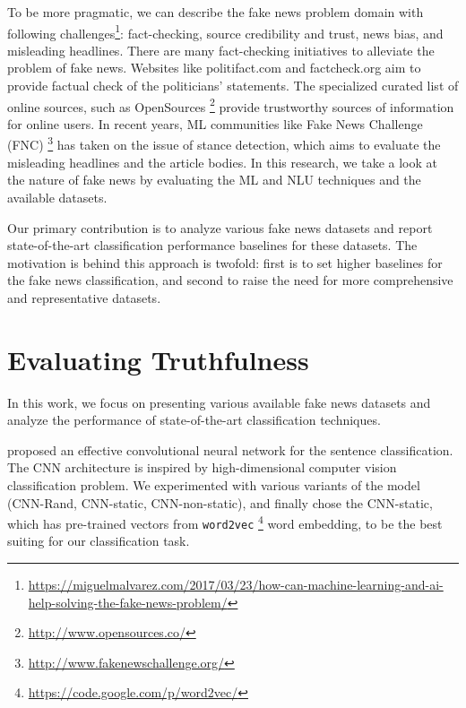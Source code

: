To be more pragmatic, we can describe the fake news problem domain with following challenges\footnote{\url{https://miguelmalvarez.com/2017/03/23/how-can-machine-learning-and-ai-help-solving-the-fake-news-problem/}}: fact-checking, source credibility and trust, news bias, and misleading headlines. There are many fact-checking initiatives to alleviate the problem of fake news. Websites like politifact.com and factcheck.org aim to provide factual check of the politicians' statements. The specialized curated list of online sources, such as OpenSources \footnote{\url{http://www.opensources.co/}} provide trustworthy sources of information for online users.  In recent years,  ML communities like Fake News Challenge (FNC) \footnote{\url{http://www.fakenewschallenge.org/}} has taken on the issue of stance detection, which aims to evaluate the misleading headlines and the article bodies. In this research, we take a look at the nature of fake news by evaluating the ML and NLU techniques and the available datasets.

Our primary contribution is to analyze various fake news datasets and report state-of-the-art classification performance baselines for these datasets. The motivation is behind this approach is twofold: first is to set higher baselines for the fake news classification, and second to raise the need for more comprehensive and representative datasets.  


\section{Evaluating Truthfulness}
\vspace{-1em}
In this work, we focus on presenting various available fake news datasets and analyze the performance of state-of-the-art classification techniques.   

\citet{Kim14convolutionalneural} proposed an effective convolutional neural network for the sentence classification. The CNN architecture is inspired by high-dimensional computer vision classification problem. We experimented with various variants of the model (CNN-Rand, CNN-static, CNN-non-static), and finally chose the CNN-static, which has pre-trained vectors from \texttt{word2vec} \footnote{\url{https://code.google.com/p/word2vec/}} word embedding, to be the best suiting for our classification task.

